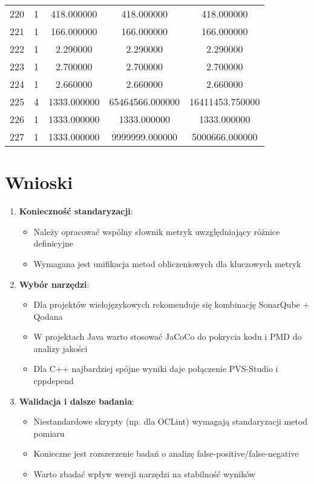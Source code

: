 \documentclass[a4paper,12pt]{article}
\begin{document}
\begin{center}
\begin{longtable}{l S[table-format=3.0] S[table-format=8.2] S[table-format=8.2] S[table-format=8.2]}
        220   &   1   &   418.000000   &    418.000000     &     418.000000 \\
        221   &   1   &   166.000000   &    166.000000     &     166.000000 \\
        222   &   1   &     2.290000   &      2.290000     &       2.290000 \\
        223   &   1   &     2.700000   &      2.700000     &       2.700000 \\
        224   &   1   &     2.660000   &      2.660000     &       2.660000 \\
        225   &   4   &  1333.000000   &  65464566.000000   &  16411453.750000 \\
        226   &   1   &  1333.000000   &   1333.000000     &    1333.000000 \\
        227   &   1   &  1333.000000   &  9999999.000000    &  5000666.000000 \\
\end{longtable}
\end{center}


\section{Wnioski}

\begin{enumerate}
\item \textbf{Konieczność standaryzacji}:
\begin{itemize}
\item Należy opracować wspólny słownik metryk uwzględniający różnice definicyjne
\item Wymagana jest unifikacja metod obliczeniowych dla kluczowych metryk
\end{itemize}

\item \textbf{Wybór narzędzi}:
\begin{itemize}
\item Dla projektów wielojęzykowych rekomenduje się kombinację SonarQube + Qodana
\item W projektach Java warto stosować JaCoCo do pokrycia kodu i PMD do analizy jakości
\item Dla C++ najbardziej spójne wyniki daje połączenie PVS-Studio i cppdepend
\end{itemize}

\item \textbf{Walidacja i dalsze badania}:
\begin{itemize}
\item Niestandardowe skrypty (np. dla OCLint) wymagają standaryzacji metod pomiaru
\item Konieczne jest rozszerzenie badań o analizę false-positive/false-negative
\item Warto zbadać wpływ wersji narzędzi na stabilność wyników
\end{itemize}
\end{enumerate}
\end{document}
